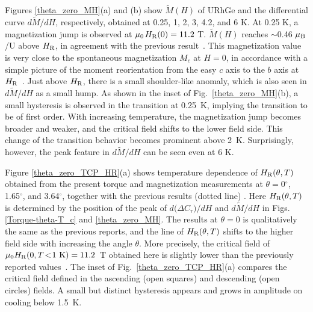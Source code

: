\documentclass[twocolumn, aps, superscriptaddress, amsfonts,floatfix]{revtex4}%
\begin{document}
{%
Figures \ref{theta_zero_MH}(a) and (b) show $\tilde{M}(H)$ of URhGe and the differential curve $d\tilde{M}/dH$, respectively,  obtained at 0.25, 1, 2, 3, 4.2, and 6 K. 
At 0.25 K, a magnetization jump  is observed at $\mu_{\rm 0}$$H_{\rm R}(0)=11.2$ T.
$\tilde{M}(H)$  reaches $\sim$0.46 $\mu_{\rm B}$/U above $H_{\rm R}$, in agreement with the previous result~\cite{hardy2011transverse}. This magnetization value is very close to the spontaneous magnetization $M_c$ at $H=0$, in accordance with a simple picture of the moment reorientation
 from the easy $c$ axis to the $b$ axis at $H_{\rm R}$~\cite{tokunaga2015reentrant,levy2009coexistence,hardy2011transverse}. 
Just above $H_{\rm R}$, there is a small shoulder-like anomaly, which is also seen in $d\tilde{M}/dH$ as a small hump.
As shown in the inset of Fig.~\ref{theta_zero_MH}(b), a small hysteresis is observed in the transition at 0.25~K, implying the transition to be of first order.
With increasing temperature, the magnetization jump becomes broader and weaker, and the critical field shifts to the lower field side.  %
This change of the transition behavior becomes prominent above 2~K. 
Surprisingly, however, the peak feature in $d\tilde{M}/dH$ can be seen even at 6 K.


 Figure \ref{theta_zero_TCP_HR}(a) shows temperature dependence of $H_{\rm R}(\theta,T)$ obtained from the present torque and magnetization measurements at $\theta = 0$$^\circ$, 1.65$^\circ$, and 3.64$^\circ$, together with the previous results (dotted line) \cite{aoki2011ferromagnetic}.
Here $H_{\rm R}(\theta,T)$ is determined by the position of the peak of $d(\Delta$$C_{\tau})$$/dH$ and $d\tilde{M}/dH$ in Figs. \ref{Torque-theta-T_c} and \ref{theta_zero_MH}.
The results at $\theta=0$ is qualitatively the same as the previous reports, and the line of $H_{\rm R}(\theta,T)$ shifts to the higher field side with increasing the angle $\theta$.
More precisely, the critical field of $\mu_0H_{\rm R}(0, T\!<\!1~{\rm K})=11.2$~T obtained here is slightly lower than the previously reported values~\cite{levy2005magnetic,levy2007acute,aoki2011ferromagnetic,hardy2011transverse}. 
The inset of Fig.~\ref{theta_zero_TCP_HR}(a) compares the critical field defined in the ascending (open squares) and descending (open circles) fields. 
A small but distinct hysteresis appears and grows in amplitude on cooling below 1.5~K.

}
\end{document}
